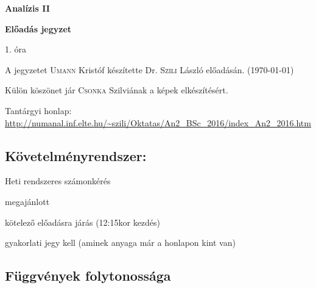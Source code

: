 \documentclass[a4paper,11.5pt]{article}
\begin{document}
	\setlength\parindent{0pt}
	\def\a{\textbf{a}}
	\def\b{\textbf{b}}
	\def\N{\hskip 10 true mm}
	\def\a{\textbf{a}}
	\def\b{\textbf{b}}
	\def\c{\textbf{c}}
	\def\d{\textbf{d}}
	\def\e{\textbf{e}}
	\def\gg{$\gamma$}
	\def\vi{\textbf{i}}
	\def\jj{\textbf{j}}
	\def\kk{\textbf{k}}
	\def\fh{\overrightarrow}
	\def\l{\lambda}
	\def\m{\mu}
	\def\v{\textbf{v}}
	\def\0{\textbf{0}}
	\def\s{\hspace{0.2mm}\vphantom{\beta}}
	\def\Z{\mathbb{Z}}
	\def\Q{\mathbb{Q}}
	\def\R{\mathbb{R}}
	\def\C{\mathbb{C}}
	\def\N{\mathbb{N}}
	\def\Rn{\mathbb{R}^{n}}
	\def\Ra{\overline{\mathbb{R}}}
	\def\sume{\displaystyle\sum_{n=1}^{+\infty}}
	\def\sumn{\displaystyle\sum_{n=0}^{+\infty}}
	\def\biz{\emph{Bizonyítás:\ }}
	\def\narrow{\underset{n\rightarrow+\infty}{\longrightarrow}}
	\def\limn{\displaystyle\lim_{n\to +\infty}}
	
	\theoremstyle{definition}
	\newtheorem{theorem}{Tétel}[subsection] %
	
	\theoremstyle{definition}
	\newtheorem{definition}[theorem]{Definíció} %
	\newtheorem{example}[theorem]{Példa} %
	\newtheorem{note}[theorem]{Megjegyzés} %
	\begin{center}
		{\LARGE \textbf{Analízis II}}
		
		{\large \textbf{Előadás jegyzet}}
		
		1. óra
	\end{center}
	A jegyzetet \textsc{Umann} Kristóf készítette Dr. \textsc{Szili} László előadásán. (\today)
	
	Külön köszönet jár \textsc{Csonka} Szilviának a képek elkészítésért.
	\bigskip
	
	Tantárgyi honlap: \url{http://numanal.inf.elte.hu/~szili/Oktatas/An2_BSc_2016/index_An2_2016.htm}
	
	\begin{center}
		\section{Követelményrendszer:}
	\end{center}
		\begin{compactitem}
			\item Heti rendszeres számonkérés
			\item megajánlott
			\item kötelező előadásra járás (12:15kor kezdés)
			\item gyakorlati jegy kell (aminek anyaga már a honlapon kint van)
		\end{compactitem}
		\begin{center}
			\section{\textbf{Függvények folytonossága}}
		\end{center}
\end{document}
